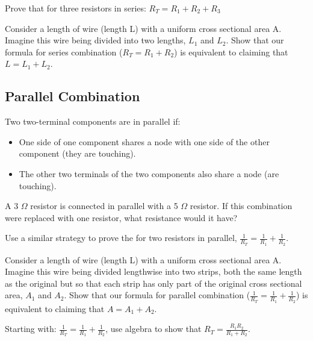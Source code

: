 \begin{clevel}
Prove that for three resistors in series: $R_T=R_1+R_2+R_3$
\end{clevel}

\begin{clevel}
Consider a length of wire (length L) with a uniform cross sectional area A. Imagine this wire being divided into two lengths, $L_1$ and $L_2$. Show that our formula for series combination ($R_T=R_1+R_2$) is equivalent to claiming that $L=L_1+L_2$. 
\end{clevel}

\subsection{Parallel Combination}
Two two-terminal components are in parallel if:
\begin{itemize}
\item One side of one component shares a node with one side of the other component (they are touching).
\item The other two terminals of the two components also share a node (are touching).
\end{itemize}

\begin{alevel}A 3 $\Omega$ resistor is connected in parallel with a 5 $\Omega$ resistor. If this combination were replaced with one resistor, what resistance would it have?
\end{alevel}

\begin{clevel}
Use a similar strategy to prove the for two resistors in parallel, $\frac{1}{R_T}=\frac{1}{R_1}+\frac{1}{R_2}$.
\end{clevel}

\begin{clevel}
Consider a length of wire (length L) with a uniform cross sectional area A. Imagine this wire being divided lengthwise into two strips, both the same length as the original but so that each strip has only part of the original cross sectional area, $A_1$ and $A_2$. Show that our formula for parallel combination ($\frac{1}{R_T}=\frac{1}{R_1}+\frac{1}{R_2}$) is equivalent to claiming that $A=A_1+A_2$. 
\end{clevel}

\begin{clevel}
Starting with: $\frac{1}{R_T}=\frac{1}{R_1}+\frac{1}{R_2}$, use algebra to show that $R_T=\frac{R_1 R_2}{R_1+R_2}$.
\end{clevel}

